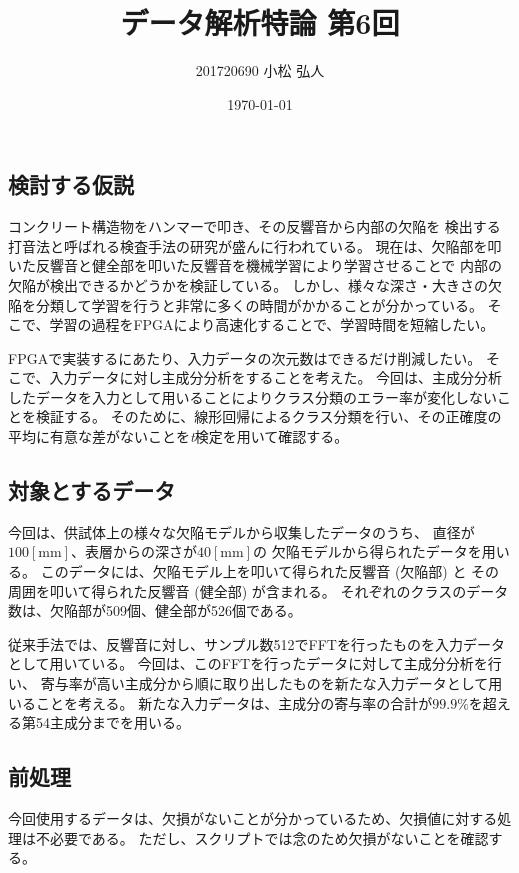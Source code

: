 \documentclass{jsarticle}
\title{データ解析特論 第6回}
\author{201720690 小松 弘人}
\date{\today}
\begin{document}
\maketitle
\thispagestyle{empty}
\subsection*{検討する仮説}
コンクリート構造物をハンマーで叩き、その反響音から内部の欠陥を
検出する打音法と呼ばれる検査手法の研究が盛んに行われている。
現在は、欠陥部を叩いた反響音と健全部を叩いた反響音を機械学習により学習させることで
内部の欠陥が検出できるかどうかを検証している。
しかし、様々な深さ・大きさの欠陥を分類して学習を行うと非常に多くの時間がかかることが分かっている。
そこで、学習の過程をFPGAにより高速化することで、学習時間を短縮したい。

FPGAで実装するにあたり、入力データの次元数はできるだけ削減したい。
そこで、入力データに対し主成分分析をすることを考えた。
今回は、主成分分析したデータを入力として用いることによりクラス分類のエラー率が変化しないことを検証する。
そのために、線形回帰によるクラス分類を行い、その正確度の平均に有意な差がないことを\emph{t}検定を用いて確認する。

\subsection*{対象とするデータ}

今回は、供試体上の様々な欠陥モデルから収集したデータのうち、
直径が$100\mathrm{[mm]}$、表層からの深さが$40\mathrm{[mm]}$の
欠陥モデルから得られたデータを用いる。
このデータには、欠陥モデル上を叩いて得られた反響音 (欠陥部) と
その周囲を叩いて得られた反響音 (健全部) が含まれる。
それぞれのクラスのデータ数は、欠陥部が509個、健全部が526個である。

従来手法では、反響音に対し、サンプル数512でFFTを行ったものを入力データとして用いている。
今回は、このFFTを行ったデータに対して主成分分析を行い、
寄与率が高い主成分から順に取り出したものを新たな入力データとして用いることを考える。
新たな入力データは、主成分の寄与率の合計が$99.9\%$を超える第54主成分までを用いる。

\subsection*{前処理}

今回使用するデータは、欠損がないことが分かっているため、欠損値に対する処理は不必要である。
ただし、スクリプトでは念のため欠損がないことを確認する。
\end{document}
